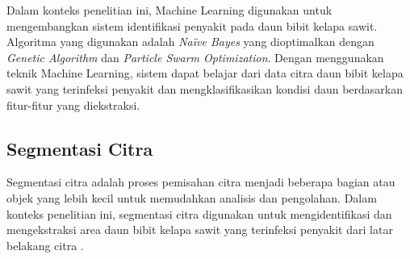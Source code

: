 Dalam konteks penelitian ini, Machine Learning digunakan untuk mengembangkan sistem identifikasi penyakit pada daun bibit kelapa sawit. Algoritma yang digunakan adalah \textit{Naïve Bayes} yang dioptimalkan dengan \textit{Genetic Algorithm} dan \textit{Particle Swarm Optimization}. Dengan menggunakan teknik Machine Learning, sistem dapat belajar dari data citra daun bibit kelapa sawit yang terinfeksi penyakit dan mengklasifikasikan kondisi daun berdasarkan fitur-fitur yang diekstraksi.





\subsection{Segmentasi Citra} \label{II. Segmentasi Citra}
Segmentasi citra adalah proses pemisahan citra menjadi beberapa bagian atau objek yang lebih kecil untuk memudahkan analisis dan pengolahan. Dalam konteks penelitian ini, segmentasi citra digunakan untuk mengidentifikasi dan mengekstraksi area daun bibit kelapa sawit yang terinfeksi penyakit dari latar belakang citra \cite{wijayaimplementasi}.

